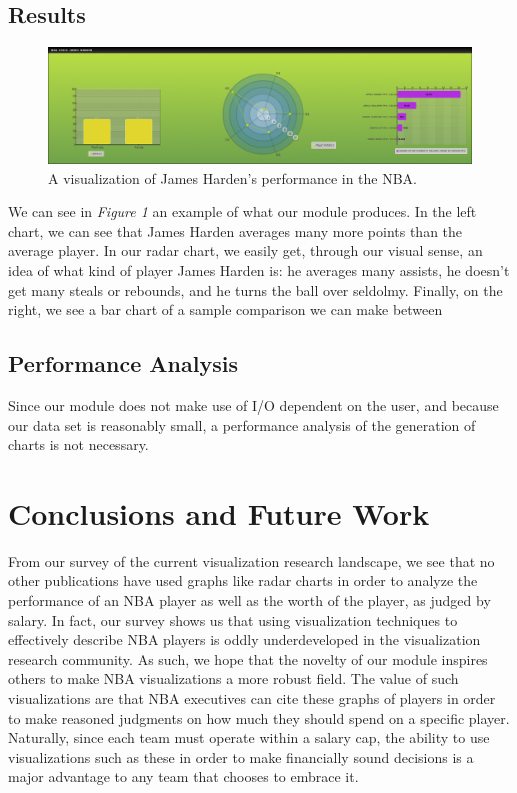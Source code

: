 \documentclass[journal]{vgtc}                %
\begin{document}
\subsection{Results}
\begin{figure}[h]
\caption{A visualization of James Harden's performance in the NBA.}
\includegraphics[width=\linewidth]{JamesHarden.png}
\end{figure}
We can see in \emph{Figure 1} an example of what our module produces. In the left chart, we can see that James Harden averages many more points than the average player. In our radar chart, we easily get, through our visual sense, an idea of what kind of player James Harden is: he averages many assists, he doesn't get many steals or rebounds, and he turns the ball over seldolmy. Finally, on the right, we see a bar chart of a sample comparison we can make between 
\subsection{Performance Analysis}
Since our module does not make use of I/O dependent on the user, and because our data set is reasonably small, a performance analysis of the generation of charts is not necessary.
\section{Conclusions and Future Work}
From our survey of the current visualization research landscape, we see that no other publications have used graphs like radar charts in order to analyze the performance of an NBA player as well as the worth of the player, as judged by salary. In fact, our survey shows us that using visualization techniques to effectively describe NBA players is oddly underdeveloped in the visualization research community. As such, we hope that the novelty of our module inspires others to make NBA visualizations a more robust field. The value of such visualizations are that NBA executives can cite these graphs of players in order to make reasoned judgments on how much they should spend on a specific player. Naturally, since each team must operate within a salary cap, the ability to use visualizations such as these in order to make financially sound decisions is a major advantage to any team that chooses to embrace it.
\end{document}
